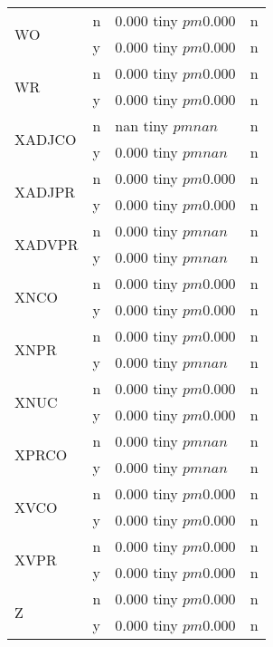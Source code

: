 \begin{table}
\begin{tabular}{llll}
\cline{1-4}
\multirow[t]{2}{*}{WO} & n & 0.000 tiny $ pm 0.000$ & n \\
 & y & 0.000 tiny $ pm 0.000$ & n \\
\cline{1-4}
\multirow[t]{2}{*}{WR} & n & 0.000 tiny $ pm 0.000$ & n \\
 & y & 0.000 tiny $ pm 0.000$ & n \\
\cline{1-4}
\multirow[t]{2}{*}{XADJCO} & n & nan tiny $ pm nan$ & n \\
 & y & 0.000 tiny $ pm nan$ & n \\
\cline{1-4}
\multirow[t]{2}{*}{XADJPR} & n & 0.000 tiny $ pm 0.000$ & n \\
 & y & 0.000 tiny $ pm 0.000$ & n \\
\cline{1-4}
\multirow[t]{2}{*}{XADVPR} & n & 0.000 tiny $ pm nan$ & n \\
 & y & 0.000 tiny $ pm nan$ & n \\
\cline{1-4}
\multirow[t]{2}{*}{XNCO} & n & 0.000 tiny $ pm 0.000$ & n \\
 & y & 0.000 tiny $ pm 0.000$ & n \\
\cline{1-4}
\multirow[t]{2}{*}{XNPR} & n & 0.000 tiny $ pm 0.000$ & n \\
 & y & 0.000 tiny $ pm nan$ & n \\
\cline{1-4}
\multirow[t]{2}{*}{XNUC} & n & 0.000 tiny $ pm 0.000$ & n \\
 & y & 0.000 tiny $ pm 0.000$ & n \\
\cline{1-4}
\multirow[t]{2}{*}{XPRCO} & n & 0.000 tiny $ pm nan$ & n \\
 & y & 0.000 tiny $ pm nan$ & n \\
\cline{1-4}
\multirow[t]{2}{*}{XVCO} & n & 0.000 tiny $ pm 0.000$ & n \\
 & y & 0.000 tiny $ pm 0.000$ & n \\
\cline{1-4}
\multirow[t]{2}{*}{XVPR} & n & 0.000 tiny $ pm 0.000$ & n \\
 & y & 0.000 tiny $ pm 0.000$ & n \\
\cline{1-4}
\multirow[t]{2}{*}{Z} & n & 0.000 tiny $ pm 0.000$ & n \\
 & y & 0.000 tiny $ pm 0.000$ & n \\
\cline{1-4}
\bottomrule
\end{tabular}
\end{table}
